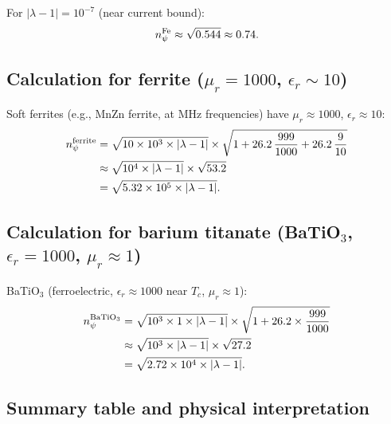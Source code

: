 \documentclass[11pt]{article}
\newcommand{\ee}[1]{\times 10^{#1}}
\begin{document}
For $|\lambda-1| = 10^{-7}$ (near current bound):
\begin{equation}
n_\psi^{\rm Fe} \approx \sqrt{0.544} \approx 0.74.
\label{eq:n-psi-Fe-num}
\end{equation}

\subsection{Calculation for ferrite ($\mu_r = 1000$, $\epsilon_r \sim 10$)}

Soft ferrites (e.g., MnZn ferrite, at MHz frequencies) have
$\mu_r \approx 1000$, $\epsilon_r \approx 10$:
\begin{align}
n_\psi^{\rm ferrite} &= \sqrt{10 \times 10^3 \times |\lambda-1|}
  \times \sqrt{1 + 26.2\,\frac{999}{1000} + 26.2\,\frac{9}{10}} \notag\\
&\approx \sqrt{10^4 \times |\lambda-1|} \times \sqrt{53.2} \notag\\
&= \sqrt{5.32\ee{5} \times |\lambda-1|}.
\label{eq:n-psi-ferrite}
\end{align}

\subsection{Calculation for barium titanate (BaTiO$_3$, $\epsilon_r = 1000$,
$\mu_r \approx 1$)}

BaTiO$_3$ (ferroelectric, $\epsilon_r \approx 1000$ near $T_c$,
$\mu_r \approx 1$):
\begin{align}
n_\psi^{\rm BaTiO_3} &= \sqrt{10^3 \times 1 \times |\lambda-1|}
  \times \sqrt{1 + 26.2 \times \frac{999}{1000}} \notag\\
&\approx \sqrt{10^3 \times |\lambda-1|} \times \sqrt{27.2} \notag\\
&= \sqrt{2.72\ee{4} \times |\lambda-1|}.
\label{eq:n-psi-BaTiO3}
\end{align}

\subsection{Summary table and physical interpretation}
\end{document}
